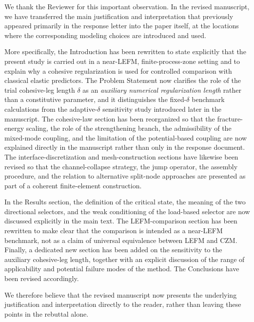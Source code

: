 \documentclass[12pt,a4paper]{article}
\begin{document}
	\begin{tcolorbox}[authorbox]
		We thank the Reviewer for this important observation. In the revised manuscript, we have transferred the main justification and interpretation that previously appeared primarily in the response letter into the paper itself, at the locations where the corresponding modeling choices are introduced and used.
		
		More specifically, the Introduction has been rewritten to state explicitly that the present study is carried out in a near-LEFM, finite-process-zone setting and to explain why a cohesive regularization is used for controlled comparison with classical elastic predictors. The Problem Statement now clarifies the role of the trial cohesive-leg length \(\delta\) as an \emph{auxiliary numerical regularization length} rather than a constitutive parameter, and it distinguishes the fixed-\(\delta\) benchmark calculations from the adaptive-\(\delta\) sensitivity study introduced later in the manuscript. The cohesive-law section has been reorganized so that the fracture-energy scaling, the role of the strengthening branch, the admissibility of the mixed-mode coupling, and the limitation of the potential-based coupling are now explained directly in the manuscript rather than only in the response document. The interface-discretization and mesh-construction sections have likewise been revised so that the channel-collapse strategy, the jump operator, the assembly procedure, and the relation to alternative split-node approaches are presented as part of a coherent finite-element construction.
		
		In the Results section, the definition of the critical state, the meaning of the two directional selectors, and the weak conditioning of the load-based selector are now discussed explicitly in the main text. The LEFM-comparison section has been rewritten to make clear that the comparison is intended as a near-LEFM benchmark, not as a claim of universal equivalence between LEFM and CZM. Finally, a dedicated new section has been added on the sensitivity to the auxiliary cohesive-leg length, together with an explicit discussion of the range of applicability and potential failure modes of the method. The Conclusions have been revised accordingly.
		
		We therefore believe that the revised manuscript now presents the underlying justification and interpretation directly to the reader, rather than leaving these points in the rebuttal alone.
	\end{tcolorbox}
	
\end{document}
